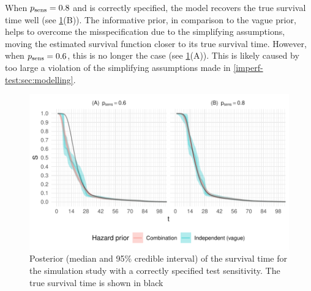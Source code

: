 \documentclass[thesis.tex]{subfiles}
\begin{document}
When $p_\text{sens} = 0.8$ and is correctly specified, the model recovers the true survival time well (see \cref{imperf-test:fig:constant-test-sensitivity}(B)).
The informative prior, in comparison to the vague prior, helps to overcome the misspecification due to the simplifying assumptions, moving the estimated survival function closer to its true survival time.
However, when $p_\text{sens} = 0.6$, this is no longer the case (see \cref{imperf-test:fig:constant-test-sensitivity}(A)).
This is likely caused by too large a violation of the simplifying assumptions made in \cref{imperf-test:sec:modelling}.
\begin{figure}
  \includegraphics[width=\textwidth]{cis-imperfect-testing/sim-constant-sensitivity}
  \caption[Simulation study results with constant test sensitivity]{%
    Posterior (median and 95\% credible interval) of the survival time for the simulation study with a correctly specified test sensitivity.
    The true survival time is shown in black
  }
  \label{imperf-test:fig:constant-test-sensitivity}
\end{figure}
\end{document}
